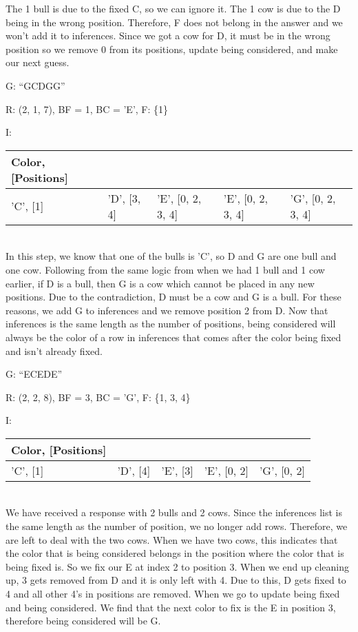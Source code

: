 \documentclass[11pt]{article}
\begin{document}
    The 1 bull is due to the fixed C, so we can ignore it. The 1 cow is due to the D being in the wrong position. Therefore, F does not belong in the answer and we won't add it to inferences. Since we got a cow for D, it must be in the wrong position so we remove 0 from its positions, update being considered, and make our next guess.

    \noindent G: \enquote{GCDGG}

    \noindent R: (2, 1, 7), BF = 1, BC = 'E', F: \{1\}

    \noindent I: \begin{tabularx}{\textwidth}{|X|X|X|X|X|}
        \hline
        Color, [Positions]&&&&\\\hline 
        'C', [1]&'D', [3, 4]&'E', [0, 2, 3, 4]&'E', [0, 2, 3, 4]&'G', [0, 2, 3, 4]\\\hline
    \end{tabularx}\\

    In this step, we know that one of the bulls is 'C', so D and G are one bull and one cow. Following from the same logic from when we had 1 bull and 1 cow earlier, if D is a bull, then G is a cow which cannot be placed in any new positions. Due to the contradiction, D must be a cow and G is a bull. For these reasons, we add G to inferences and we remove position 2 from D. Now that inferences is the same length as the number of positions, being considered will always be the color of a row in inferences that comes after the color being fixed and isn't already fixed.
    
    \noindent G: \enquote{ECEDE}

    \noindent R: (2, 2, 8), BF = 3, BC = 'G', F: \{1, 3, 4\}

    \noindent I: \begin{tabularx}{\textwidth}{|X|X|X|X|X|}
        \hline
        Color, [Positions]&&&&\\\hline 
        'C', [1]&'D', [4]&'E', [3]&'E', [0, 2]&'G', [0, 2]\\\hline
    \end{tabularx}\\
    
    We have received a response with 2 bulls and 2 cows. Since the inferences list is the same length as the number of position, we no longer add rows. Therefore, we are left to deal with the two cows. When we have two cows, this indicates that the color that is being considered belongs in the position where the color that is being fixed is. So we fix our E at index 2 to position 3. When we end up cleaning up, 3 gets removed from D and it is only left with 4. Due to this, D gets fixed to 4 and all other 4's in positions are removed. When we go to update being fixed and being considered. We find that the next color to fix is the E in position 3, therefore being considered will be G.
\end{document}
